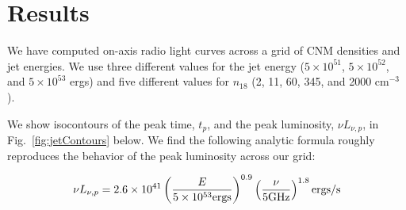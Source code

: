 \documentclass[usenatbib,fleqn]{mnras}
\begin{document}
\section{Results}
\label{sec:results}
We have computed on-axis radio light curves across a grid of CNM
densities and jet energies. We use three different values for the
jet energy ($5 \times 10^{51}$, $5 \times 10^{52}$, and $5 \times
10^{53}$ ergs) and five different values for $n_{18}$ (2, 11, 60, 345,
and 2000 cm$^{-3}$). 

We show isocontours of the peak time, $t_p$, and the peak luminosity,
$\nu L_{\nu, p}$, in Fig.~\ref{fig:jetContours} below. We find the
following analytic formula roughly reproduces the behavior of the peak
luminosity across our grid:

\begin{equation}
\nu L_{\nu, p}=2.6 \times 10^{41} \left(\frac{E}{5 \times 10^{53}
    {\rm ergs}}\right)^{0.9}
\left(\frac{\nu}{5 {\rm GHz}}\right)^{1.8} {\rm ergs/s}
\label{eq:peakLum}
\end{equation}
\end{document}

